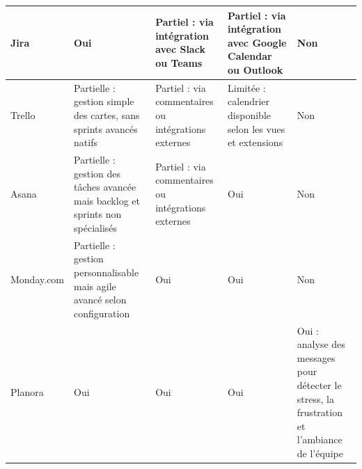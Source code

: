 \begin{longtable}[c]{|p{}|p{}|p{}|p{}|p{}|}
  Jira              & Oui                                                                            & Partiel : via intégration avec Slack ou Teams       & Partiel : via intégration avec Google Calendar ou Outlook    & Non                                                                                          \\
  \hline
  Trello            & Partielle : gestion simple des cartes, sans sprints avancés natifs             & Partiel : via commentaires ou intégrations externes & Limitée : calendrier disponible selon les vues et extensions & Non                                                                                          \\
  \hline
  Asana             & Partielle : gestion des tâches avancée mais backlog et sprints non spécialisés & Partiel : via commentaires ou intégrations externes & Oui                                                          & Non                                                                                          \\
  \hline
  Monday.com        & Partielle : gestion personnalisable mais agile avancé selon configuration      & Oui                                                 & Oui                                                          & Non                                                                                          \\
  \hline
  Planora           & Oui                                                                            & Oui                                                 & Oui                                                          & Oui : analyse des messages pour détecter le stress, la frustration et l'ambiance de l'équipe \\
  \hline
\end{longtable}

